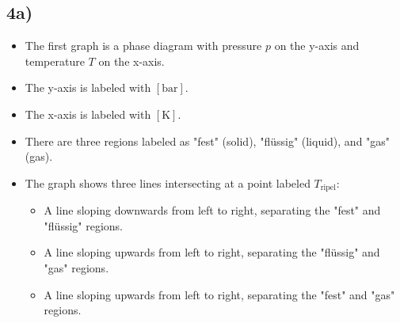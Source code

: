 

\subsection*{4a)}

\begin{itemize}
    \item The first graph is a phase diagram with pressure \( p \) on the y-axis and temperature \( T \) on the x-axis.
    \item The y-axis is labeled with \([ \text{bar} ]\).
    \item The x-axis is labeled with \([ \text{K} ]\).
    \item There are three regions labeled as "fest" (solid), "flüssig" (liquid), and "gas" (gas).
    \item The graph shows three lines intersecting at a point labeled \( T_{\text{ripel}} \):
        \begin{itemize}
            \item A line sloping downwards from left to right, separating the "fest" and "flüssig" regions.
            \item A line sloping upwards from left to right, separating the "flüssig" and "gas" regions.
            \item A line sloping upwards from left to right, separating the "fest" and "gas" regions.
        \end{itemize}
\end{itemize}